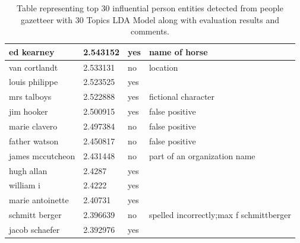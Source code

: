 \documentclass[letterpaper,11pt]{report}
\begin{document}
\begin{table}[!h]
\begin{tabular}{|l|l|p{3cm}|p{3cm}|}
ed kearney       & 2.543152 & yes                & name of horse                        \\ \hline
van cortlandt    & 2.533131 & no                 & location                             \\ \hline
louis philippe   & 2.523525 & yes                &                                      \\ \hline
mrs talboys      & 2.522888 & yes                & fictional character                  \\ \hline
jim hooker       & 2.500915 & yes                & false positive                       \\ \hline
marie clavero    & 2.497384 & no                 & false positive                       \\ \hline
father watson    & 2.450817 & no                 & false positive                       \\ \hline
james mccutcheon & 2.431448 & no                 & part of an organization name                      \\ \hline
hugh allan       & 2.4287   & yes                &                                      \\ \hline
william i        & 2.4222   & yes                &                                      \\ \hline
marie antoinette & 2.40731  & yes                &                                      \\ \hline
schmitt berger   & 2.396639 & no                 & spelled incorrectly;max f schmittberger                       \\ \hline
jacob schaefer   & 2.392976 & yes                &                                      \\ \hline
             
\end{tabular}
\caption{Table representing top 30 influential person entities detected from people gazetteer with 30 Topics LDA Model along with evaluation results and comments.}
\label{table:app1}
\end{table}
\end{document}
